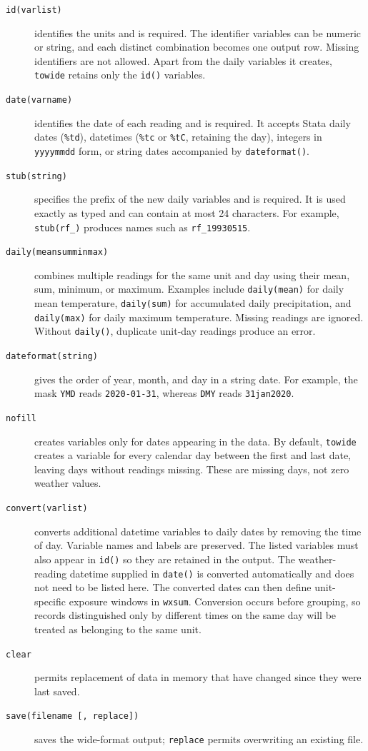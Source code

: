 \begin{description}
	\item[\texttt{id(varlist)}] identifies the units and is required. The identifier variables can be numeric or string, and each distinct combination becomes one output row. Missing identifiers are not allowed. Apart from the daily variables it creates, \texttt{towide} retains only the \texttt{id()} variables.
	\item[\texttt{date(varname)}] identifies the date of each reading and is required. It accepts Stata daily dates (\texttt{\%td}), datetimes (\texttt{\%tc} or \texttt{\%tC}, retaining the day), integers in \texttt{yyyymmdd} form, or string dates accompanied by \texttt{dateformat()}.
	\item[\texttt{stub(string)}] specifies the prefix of the new daily variables and is required. It is used exactly as typed and can contain at most 24 characters. For example, \texttt{stub(rf\_)} produces names such as \texttt{rf\_19930515}.
	\item[\texttt{daily(mean\textbar sum\textbar min\textbar max)}] combines multiple readings for the same unit and day using their mean, sum, minimum, or maximum. Examples include \texttt{daily(mean)} for daily mean temperature, \texttt{daily(sum)} for accumulated daily precipitation, and \texttt{daily(max)} for daily maximum temperature. Missing readings are ignored. Without \texttt{daily()}, duplicate unit-day readings produce an error.
	\item[\texttt{dateformat(string)}] gives the order of year, month, and day in a string date. For example, the mask \texttt{YMD} reads \texttt{2020-01-31}, whereas \texttt{DMY} reads \texttt{31jan2020}.
	\item[\texttt{nofill}] creates variables only for dates appearing in the data. By default, \texttt{towide} creates a variable for every calendar day between the first and last date, leaving days without readings missing. These are missing days, not zero weather values.
	\item[\texttt{convert(varlist)}] converts additional datetime variables to daily dates by removing the time of day. Variable names and labels are preserved. The listed variables must also appear in \texttt{id()} so they are retained in the output. The weather-reading datetime supplied in \texttt{date()} is converted automatically and does not need to be listed here. The converted dates can then define unit-specific exposure windows in \texttt{wxsum}. Conversion occurs before grouping, so records distinguished only by different times on the same day will be treated as belonging to the same unit.
	\item[\texttt{clear}] permits replacement of data in memory that have changed since they were last saved.
	\item[\texttt{save(filename [, replace])}] saves the wide-format output; \texttt{replace} permits overwriting an existing file.
\end{description}

